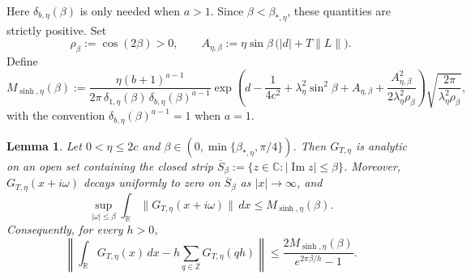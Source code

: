 \documentclass[10pt,reqno]{article}
\numberwithin{equation}{section}
\theoremstyle{plain}
\newtheorem{lem}[thm]{Lemma}
\theoremstyle{definition}
\begin{document}
Here \(\delta_{b,\eta}(\beta)\) is only needed when \(a>1\). Since \(\beta<\beta_{\ast,\eta}\), these quantities are strictly positive. Set
\begin{equation}\label{eq:sinh-rho-A-def}
\rho_\beta:=\cos(2\beta)>0, \qquad A_{\eta,\beta} := \eta\sin\beta\,\bigl(|d|+T\|L\|\bigr).
\end{equation}
Define
\begin{equation}\label{eq:Msinh-explicit-def}
M_{\operatorname{sinh},\eta}(\beta) := \frac{\eta (b+1)^{a-1}}{2\pi\,\delta_{1,\eta}(\beta)\,\delta_{b,\eta}(\beta)^{a-1}}\exp\left(d-\frac{1}{4c^2}+\lambda_\eta^2\sin^2\beta+A_{\eta,\beta}+\frac{A_{\eta,\beta}^2}{2\lambda_\eta^2\rho_\beta}\right)\sqrt{\frac{2\pi}{\lambda_\eta^2\rho_\beta}},
\end{equation}
with the convention \(\delta_{b,\eta}(\beta)^{a-1}=1\) when \(a=1\).

\begin{lem}\label{sinh-strip-bound}
Let \(0<\eta\le 2c\) and \(\beta\in(0,\min\{\beta_{\ast,\eta},\pi/4\})\). Then \(G_{T,\eta}\) is analytic on an open set containing the closed strip \(\overline S_\beta := \{z\in\mathbb C:|\operatorname{Im}z|\le\beta\}\). Moreover, \(G_{T,\eta}(x+i\omega)\) decays uniformly to zero on \(\overline S_\beta\) as \(|x|\to\infty\), and
\begin{equation}\label{eq:sinh-strip-L1-bound}
\sup_{|\omega|\le\beta}\int_{\mathbb R}\|G_{T,\eta}(x+i\omega)\|\,dx \le M_{\operatorname{sinh},\eta}(\beta).
\end{equation}
Consequently, for every \(h>0\),
\begin{equation}\label{eq:sinh-infinite-trap-error}
\left\|\int_{\mathbb R}G_{T,\eta}(x)\,dx-h\sum_{q\in\mathbb Z}G_{T,\eta}(qh)\right\|\le \frac{2M_{\operatorname{sinh},\eta}(\beta)}{e^{2\pi\beta/h}-1}.
\end{equation}
\end{lem}
\end{document}
